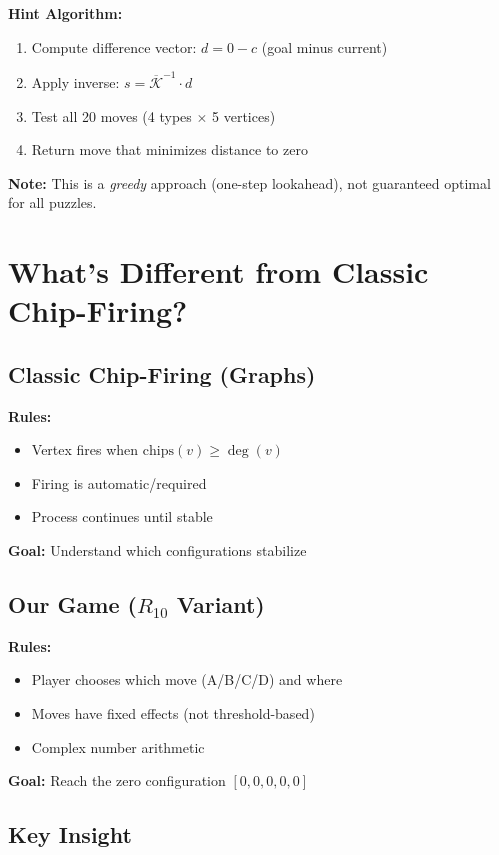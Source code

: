 \documentclass[11pt]{article}
\begin{document}
\textbf{Hint Algorithm:}
\begin{enumerate}
    \item Compute difference vector: $d = 0 - c$ (goal minus current)
    \item Apply inverse: $s = \overline{\mathcal{K}}^{-1} \cdot d$
    \item Test all 20 moves (4 types $\times$ 5 vertices)
    \item Return move that minimizes distance to zero
\end{enumerate}

\textbf{Note:} This is a \emph{greedy} approach (one-step lookahead), not guaranteed optimal for all puzzles.

\section{What's Different from Classic Chip-Firing?}

\subsection{Classic Chip-Firing (Graphs)}

\textbf{Rules:}
\begin{itemize}
    \item Vertex fires when $\text{chips}(v) \geq \deg(v)$
    \item Firing is automatic/required
    \item Process continues until stable
\end{itemize}

\textbf{Goal:} Understand which configurations stabilize

\subsection{Our Game ($R_{10}$ Variant)}

\textbf{Rules:}
\begin{itemize}
    \item Player chooses which move (A/B/C/D) and where
    \item Moves have fixed effects (not threshold-based)
    \item Complex number arithmetic
\end{itemize}

\textbf{Goal:} Reach the zero configuration $[0, 0, 0, 0, 0]$

\subsection{Key Insight}
\end{document}
